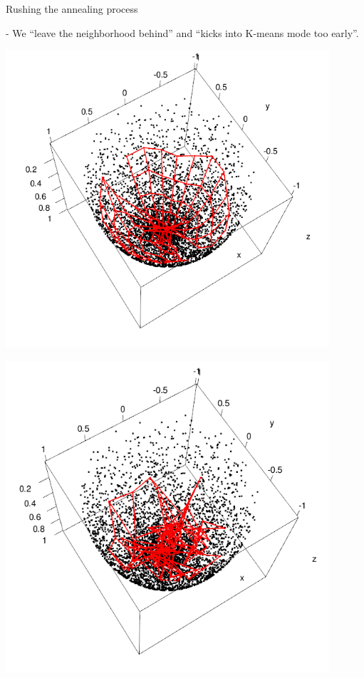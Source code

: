 \begin{frame}{Rushing the annealing process}


- We ``leave the neighborhood behind'' and ``kicks into K-means mode too early''.

\begin{minipage}{0.45\textwidth}
\begin{center}
	\includegraphics[width=0.9\textwidth]{img/3-bowlS2-2}
\end{center}
\end{minipage}
\begin{minipage}{0.45\textwidth}
\begin{center}
	\includegraphics[width=0.9\textwidth]{img/3-bowlS2-1}
\end{center}
\end{minipage}

\end{frame}

